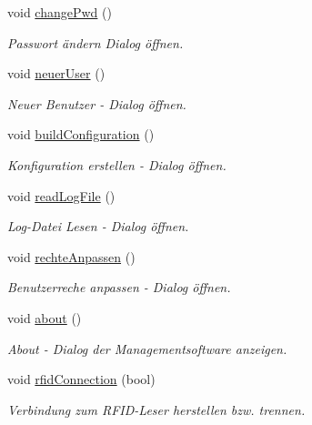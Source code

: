 \begin{CompactItemize}
void \hyperlink{class_b_e_o___timing_b705f7916ae9647060ea70c1e8fb60d8}{changePwd} ()
\begin{CompactList}\small\item\em Passwort ändern Dialog öffnen. \item\end{CompactList}\item 
void \hyperlink{class_b_e_o___timing_1ae33dd83b22ab12aed7c68028ad363a}{neuerUser} ()
\begin{CompactList}\small\item\em Neuer Benutzer - Dialog öffnen. \item\end{CompactList}\item 
void \hyperlink{class_b_e_o___timing_c8299f8565050c6390965b2a1df80ab0}{buildConfiguration} ()
\begin{CompactList}\small\item\em Konfiguration erstellen - Dialog öffnen. \item\end{CompactList}\item 
void \hyperlink{class_b_e_o___timing_0e2af5a5752098ca296327f4f41bf2c6}{readLogFile} ()
\begin{CompactList}\small\item\em Log-Datei Lesen - Dialog öffnen. \item\end{CompactList}\item 
void \hyperlink{class_b_e_o___timing_92ea80de324e788dbc928e655b70e631}{rechteAnpassen} ()
\begin{CompactList}\small\item\em Benutzerreche anpassen - Dialog öffnen. \item\end{CompactList}\item 
void \hyperlink{class_b_e_o___timing_2f021b28df0eb948aa69146ab5631c02}{about} ()
\begin{CompactList}\small\item\em About - Dialog der Managementsoftware anzeigen. \item\end{CompactList}\item 
void \hyperlink{class_b_e_o___timing_d303ff34c6d33593cb57e1fc1881d991}{rfidConnection} (bool)
\begin{CompactList}\small\item\em Verbindung zum RFID-Leser herstellen bzw. trennen. \item\end{CompactList}\item 

\end{CompactItemize}
